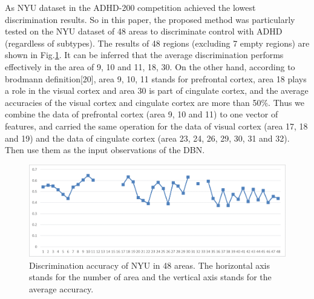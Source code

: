 \documentclass{llncs}
\begin{document}
As NYU dataset in the ADHD-200 competition achieved the lowest discrimination results. So in this paper, the proposed method was particularly tested on the NYU dataset of 48 areas to discriminate control with ADHD (regardless of subtypes). The results of 48 regions (excluding 7 empty regions) are shown in Fig.\ref{fig:4}. It can be inferred that the average discrimination performs effectively in the area of 9, 10 and 11, 18, 30. On the other hand, according to brodmann definition[20], area 9, 10, 11 stands for prefrontal cortex, area 18 plays a role in the visual cortex and area 30 is part of cingulate cortex, and the average accuracies of the visual cortex and cingulate cortex are more than 50\%. Thus we combine the data of prefrontal cortex (area 9, 10 and 11) to one vector of features, and carried the same operation for the data of visual cortex (area 17, 18 and 19) and the data of cingulate cortex (area 23, 24, 26, 29, 30, 31 and 32). Then use them as the input observations of the DBN. \\
\begin{figure}[!htbp]
	\begin{center}
		\includegraphics[scale=0.35]{figs/fig4.png}
	\end{center}    	
\caption{Discrimination accuracy of NYU in 48 areas. The horizontal axis stands for the number of area and the vertical axis stands for the average accuracy.}
\label{fig:4}  
\end{figure}
\end{document}
